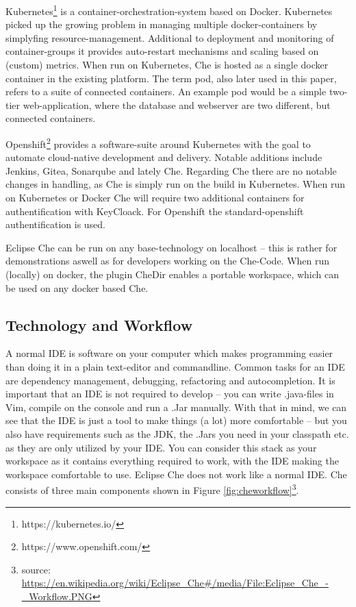 \documentclass[utf8]{lni}
\begin{document}
Kubernetes\footnote{https://kubernetes.io/} is a container-orchestration-system based on Docker. 
Kubernetes picked up the growing problem in managing multiple docker-containers by  simplyfing  resource-management. 
Additional to deployment and monitoring of container-groups it provides auto-restart mechanisms and scaling based on (custom) metrics. 
When run on Kubernetes, Che is hosted as a single docker container in the existing platform.
The term pod, also later used in this paper, refers to a suite of connected containers. 
An example pod would be a simple two-tier web-application, where the database and webserver are two different, but connected containers.

Openshift\footnote{https://www.openshift.com/} provides a software-suite around Kubernetes with the goal to automate cloud-native development and delivery.
Notable  additions  include  Jenkins,  Gitea,  Sonarqube and lately Che. 
Regarding Che there are no notable changes in handling, as Che is simply run on the build in Kubernetes.
When run on Kubernetes or Docker Che will require two additional containers for authentification with KeyCloack. 
For Openshift the standard-openshift authentification is used.  

Eclipse Che  can be run  on any  base-technology  on  localhost – this is rather for demonstrations aswell as for developers working on the Che-Code. 
When run (locally) on docker, the plugin CheDir enables a portable workspace, 
which can be used on any docker based Che.
\subsection{Technology and Workflow}
\label{subsec:Tec}
A normal IDE is software on your computer which makes programming easier than doing it in a plain text-editor and commandline. 
Common tasks for an IDE are dependency management, debugging, refactoring and autocompletion.
It is important that an IDE is not required to develop – you can write .java-files in Vim, compile on the console and run a .Jar manually. 
With that in mind, we can see that the IDE is just a tool to make things (a lot) more comfortable – but you also have requirements such as the JDK, the .Jars you need in your classpath etc. as they are only utilized by your IDE.
You can consider this stack as your workspace as it contains everything required to work, with the IDE making the workspace comfortable to use.
Eclipse Che does not work like a normal IDE. 
Che consists of three main components shown in Figure \ref{fig:cheworkflow}\footnote{source: \url{https://en.wikipedia.org/wiki/Eclipse_Che\#/media/File:Eclipse_Che_-_Workflow.PNG}}.
\end{document}

